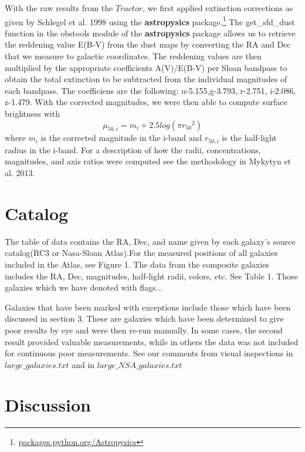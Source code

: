 \documentclass[12pt,preprint,pdftex]{aastex}
\begin{document}
With the raw results from the $Tractor$, we first applied extinction corrections as given by Schlegel et al. 1998 using the \textbf{astropysics} package.\footnote{\url{packages.python.org/Astropysics}} The get\_sfd\_dust function in the obstools module of the {\bf astropysics} package allows us to retrieve the reddening value E(B-V) from the dust maps by converting the RA and Dec that we measure to galactic coordinates. The reddening values are then multiplied by the appropriate coefficients A(V)/E(B-V) per Sloan bandpass to obtain the total extinction to be subtracted from the individual magnitudes of each bandpass. The coefficiens are the following: u-5.155,g-3.793, r-2.751, i-2.086, z-1.479. With the corrected magnitudes, we were then able to compute surface brightness with \begin{equation} \mu_{50,i}=m_i+2.5log(\pi{r_{50}}^2) \end{equation} where $m_i$ is the corrected magnitude in the i-band and $r_{50,i}$ is the half-light radius in the i-band. For a description of how the radii, concentrations, magnitudes, and axis ratios were computed see the methodology in Mykytyn et al. 2013. 



\section{Catalog}
The table of data contains the RA, Dec, and name given by each galaxy's source catalog(RC3 or Nasa-Sloan Atlas).For the measured positions of all galaxies included in the Atlas, see Figure 1. The data from the composite galaxies includes the RA, Dec, magnitudes, half-light radii, colors, etc. See Table 1. Those galaxies which we have denoted with flags... 


Galaxies that have been marked with exceptions include those which have been discussed in section 3. These are galaxies which have been determined to give poor results by eye and were then re-run manually. In some cases, the second result provided valuable measurements, while in others the data was not included for continuous poor measurements. See our comments from visual inspections in $large\_galaxies.txt$ and in $large\_NSA\_galaxies.txt$

\section{Discussion}
\end{document}
